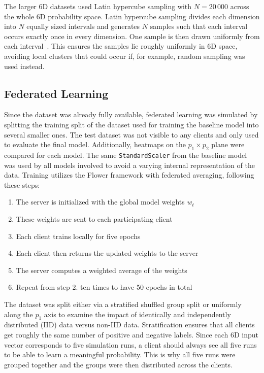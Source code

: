 \documentclass[a4paper]{scrartcl}
\begin{document}
The larger 6D datasets used Latin hypercube sampling with $N = 20\,000$ across the whole 6D probability space. Latin hypercube sampling divides each dimension into $N$ equally sized intervals and generates $N$ samples such that each interval occurs exactly once in every dimension. One sample is then drawn uniformly from each interval~\cite{latin_hypercube}. This ensures the samples lie roughly uniformly in 6D space, avoiding local clusters that could occur if, for example, random sampling was used instead.

\subsection{Federated Learning}
Since the dataset was already fully available, federated learning was simulated by splitting the training split of the dataset used for training the baseline model into several smaller ones. The test dataset was not visible to any clients and only used to evaluate the final model. Additionally, heatmaps on the $p_1 \times p_2$ plane were compared for each model. The same \texttt{StandardScaler} from the baseline model was used by all models involved to avoid a varying internal representation of the data. Training utilizes the Flower framework with federated averaging, following these steps:

\begin{enumerate}
    \item The server is initialized with the global model weights $w_t$
    \item These weights are sent to each participating client
    \item Each client trains locally for five epochs
    \item Each client then returns the updated weights to the server
    \item The server computes a weighted average of the weights
    \item Repeat from step 2. ten times to have 50 epochs in total
\end{enumerate}

The dataset was split either via a stratified shuffled group split or uniformly along the $p_1$ axis to examine the impact of identically and independently distributed (IID) data versus non-IID data. Stratification ensures that all clients get roughly the same number of positive and negative labels. Since each 6D input vector corresponds to five simulation runs, a client should always see all five runs to be able to learn a meaningful probability. This is why all five runs were grouped together and the groups were then distributed across the clients.
\end{document}
